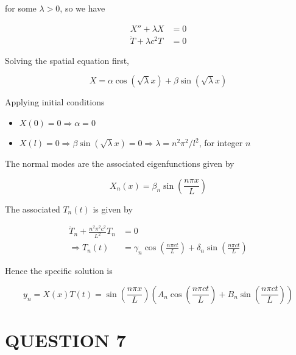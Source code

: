 \documentclass[a4paper]{article}
\begin{document}
for some $ \lambda > 0 $, so we have

\begin{align*}
X'' + \lambda X& =0 \\
\ddot{T}  + \lambda c^{2} T & = 0 
\end{align*}

Solving the spatial equation first,

\[ X = \alpha \cos ( \sqrt{\lambda} x ) + \beta \sin ( \sqrt{\lambda} x ) \]

Applying initial conditions

\begin{itemize}
	\item $ X(0) = 0 \Rightarrow \alpha = 0$
	\item $ X(l) = 0 \Rightarrow \beta \sin ( \sqrt{\lambda} x ) = 0 \Rightarrow \lambda = n^{2} \pi^{2} / l^{2} $, for integer $ n $
\end{itemize}

The normal modes are the associated eigenfunctions given by

\[ X_{n}(x) = \beta_{n} \sin \left(  \frac{n \pi x}{L} \right)  \]

The associated $ T_{n}(t) $ is given by

\begin{align*}
 \ddot{T}_{n} + \frac{n^{2} \pi^{2} c^{2} }{L^{2}}  T_{n} & = 0 \\
\Rightarrow T_{n}(t) & = \gamma_{n} \cos \left(  \frac{n \pi c t}{L} \right) + \delta_{n} \sin \left(  \frac{n \pi c t}{L} \right)  
\end{align*}

Hence the specific solution is 

\[ y_{n} = X(x) T(t)   = \sin \left(  \frac{n \pi x}{L} \right)  \left(  A_{n} \cos  \left(  \frac{n \pi ct}{L} \right) + B_{n} \sin  \left(  \frac{n \pi ct}{L} \right) \right)    \]


\section{QUESTION 7}
\end{document}
